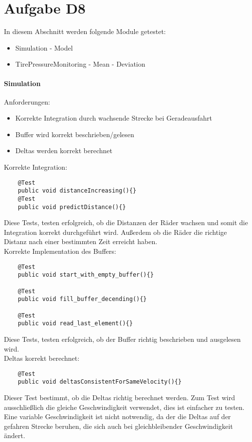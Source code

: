 
\chapter{Aufgabe D8}
In diesem Abschnitt werden folgende Module getestet:
\begin{itemize}
	\item Simulation
			\subitem - Model
	\item TirePressureMonitoring
			\subitem - Mean 
			\subitem - Deviation
\end{itemize}
\subsubsection{Simulation}
Anforderungen:
\begin{itemize}
	\item Korrekte Integration durch wachsende Strecke bei Geradeausfahrt
	\item Buffer wird korrekt beschrieben/gelesen
	\item Deltas werden korrekt berechnet
\end{itemize}
Korrekte Integration:
\begin{lstlisting}
	@Test
	public void distanceIncreasing(){}
	@Test
	public void predictDistance(){}
\end{lstlisting}
Diese Tests, testen erfolgreich, ob die Distanzen der Räder wachsen und somit die Integration korrekt durchgeführt wird. Außerdem ob die Räder die richtige Distanz nach einer bestimmten Zeit erreicht haben.\\

Korrekte Implementation des Buffers:
\begin{lstlisting}
	@Test
	public void start_with_empty_buffer(){}
	
	@Test
	public void fill_buffer_decending(){}
	
	@Test
	public void read_last_element(){}
\end{lstlisting}
Diese Tests, testen erfolgreich, ob der Buffer richtig beschrieben und ausgelesen wird.\\

Deltas korrekt berechnet:
\begin{lstlisting}
	@Test
	public void deltasConsistentForSameVelocity(){}
\end{lstlisting}
Dieser Test bestimmt, ob die Deltas richtig berechnet werden. Zum Test wird ausschließlich die gleiche Geschwindigkeit verwendet, dies ist einfacher zu testen. Eine variable Geschwindigkeit ist nicht notwendig, da der die Deltas auf der gefahren Strecke beruhen, die sich auch bei gleichbleibender Geschwindigkeit ändert.


